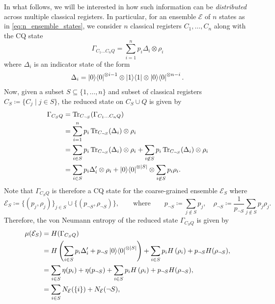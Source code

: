 \documentclass[notitlepage, 10pt]{article}
\begin{document}
In what follows, we will be interested in how such information can be \textit{distributed} across multiple classical registers.
In particular, for an ensemble $\mathcal E$ of $n$ states as in \cref{eq:n_ensemble_states}, we consider $n$ classical registers $C_1, \ldots, C_n$ along with the CQ state
\begin{equation}
    \Gamma_{C_1\ldots C_n Q} = \sum_{i=1}^{n} p_i \Delta_{i} \otimes \rho_i
\end{equation}
where $\Delta_i$ is an indicator state of the form
\begin{equation}
    \Delta_i = \ket 0 \! \bra 0^{\otimes i-1} \otimes \ket 1 \! \bra 1 \otimes \ket 0 \! \bra 0^{\otimes n - i}.
\end{equation}
Now, given a subset $S \subseteq \{1,\ldots, n\}$ and subset of classical registers $C_S \coloneqq \{ C_j \mid j \in S\}$, the reduced state on $C_S \cup Q$ is given by
\begin{align}
    \Gamma_{C_S Q} 
    &= \operatorname{Tr}_{C_{\neg S}} (\Gamma_{C_1\ldots C_n Q}) \\
    &= \sum_{i=1}^{n} p_i \operatorname{Tr}_{C_{\neg S}} (\Delta_{i}) \otimes \rho_i \\
    &= \sum_{i\in S} p_i \operatorname{Tr}_{C_{\neg S}} (\Delta_{i}) \otimes \rho_i + \sum_{i\not \in S} p_i \operatorname{Tr}_{C_{\neg S}} (\Delta_{i}) \otimes \rho_i\\
    &= \sum_{i\in S} p_i \Delta_{i}' \otimes \rho_i +  \ket 0 \! \bra 0^{\otimes |S|}\otimes \sum_{i\not \in S} p_i \rho_i.
\end{align}
Note that $\Gamma_{C_S Q}$ is therefore a CQ state for the coarse-grained ensemble $\mathcal E_S$ where
\begin{equation}
    \label{eq:S_coarse_grained}
    \mathcal E_S \coloneqq \{ (p_j, \rho_j) \}_{j \in S} \cup \{ (p_{\neg S}, \rho_{\neg S}) \}, \qquad \text{where} \qquad p_{\neg S} \coloneqq \sum_{j\not \in S}p_j, \quad \rho_{\neg S} \coloneqq \frac{1}{p_{\neg S}}\sum_{j\not \in S}p_j\rho_j.
\end{equation}
Therefore, the von Neumann entropy of the reduced state $\Gamma_{C_S Q}$ is given by
\begin{align}
    \mu(\mathcal E_{S}) 
    &= H(\Gamma_{C_S Q}) \\
    &=H\left(\sum_{i\in S} p_i \Delta_i' + p_{\neg S} \ket 0 \! \bra 0^{\otimes |S|} \right) + \sum_{i\in S} p_i H\left(\rho_i\right) + p_{\neg S}H(\rho_{\neg S}), \\
    &= \sum_{i\in S} \eta(p_i) + \eta(p_{\neg S}) + \sum_{i\in S} p_i H\left(\rho_i\right) + p_{\neg S}H(\rho_{\neg S}), \\
    &= \sum_{i\in S} N_{\mathcal E}(\{ i \}) + N_{\mathcal E}(\neg S),
\end{align}
\end{document}
